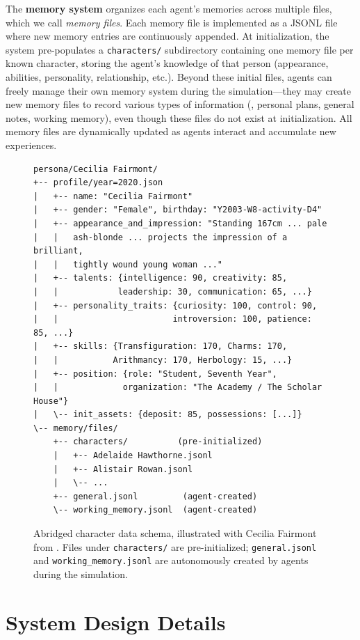 The \textbf{memory system} organizes each agent's memories across multiple files, which we call \textit{memory files}.
Each memory file is implemented as a JSONL file where new memory entries are continuously appended.
At initialization, the system pre-populates a \texttt{characters/} subdirectory containing one memory file per known character,
storing the agent's knowledge of that person (appearance, abilities, personality, relationship, etc.).
Beyond these initial files, agents can freely manage their own memory system during the simulation---they may create new memory files
to record various types of information (\eg, personal plans, general notes, working memory), even though these files do not exist at initialization.
All memory files are dynamically updated as agents interact and accumulate new experiences.

\begin{figure}[h]
\centering
\small
\begin{verbatim}
persona/Cecilia Fairmont/
+-- profile/year=2020.json
|   +-- name: "Cecilia Fairmont"
|   +-- gender: "Female", birthday: "Y2003-W8-activity-D4"
|   +-- appearance_and_impression: "Standing 167cm ... pale
|   |   ash-blonde ... projects the impression of a brilliant,
|   |   tightly wound young woman ..."
|   +-- talents: {intelligence: 90, creativity: 85,
|   |            leadership: 30, communication: 65, ...}
|   +-- personality_traits: {curiosity: 100, control: 90,
|   |                       introversion: 100, patience: 85, ...}
|   +-- skills: {Transfiguration: 170, Charms: 170,
|   |           Arithmancy: 170, Herbology: 15, ...}
|   +-- position: {role: "Student, Seventh Year",
|   |             organization: "The Academy / The Scholar House"}
|   \-- init_assets: {deposit: 85, possessions: [...]}
\-- memory/files/
    +-- characters/          (pre-initialized)
    |   +-- Adelaide Hawthorne.jsonl
    |   +-- Alistair Rowan.jsonl
    |   \-- ...
    +-- general.jsonl         (agent-created)
    \-- working_memory.jsonl  (agent-created)
\end{verbatim}
\caption{Abridged character data schema, illustrated with Cecilia Fairmont from \academy{}. Files under \texttt{characters/} are pre-initialized; \texttt{general.jsonl} and \texttt{working\_memory.jsonl} are autonomously created by agents during the simulation.}
\label{fig:schema}
\end{figure}

\section{System Design Details}
\label{app:system_design}

